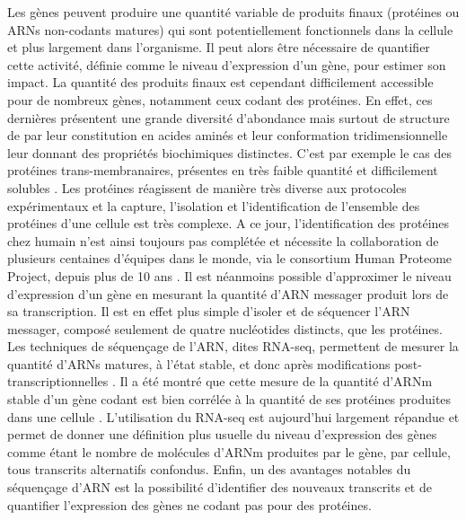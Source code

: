Les gènes peuvent produire une quantité variable de produits finaux (protéines ou \acrshort{ARN}s non-codants matures) qui sont potentiellement fonctionnels dans la cellule et plus largement dans l’organisme. Il peut alors être nécessaire de quantifier cette activité, définie comme le niveau d'expression d’un gène, pour estimer son impact. La quantité des produits finaux est cependant difficilement accessible pour de nombreux gènes, notamment ceux codant des protéines. En effet, ces dernières présentent une grande diversité d’abondance mais surtout de structure de par leur constitution en acides aminés et leur conformation tridimensionnelle leur donnant des propriétés biochimiques distinctes. C’est par exemple le cas des protéines trans-membranaires, présentes en très faible quantité et difficilement solubles \citep{vuckovic_membrane_2013}. Les protéines réagissent de manière très diverse aux protocoles expérimentaux et la capture, l’isolation et l’identification de l’ensemble des protéines d’une cellule est très complexe. A ce jour, l’identification des protéines chez humain n’est ainsi toujours pas complétée et nécessite la collaboration de plusieurs centaines d'équipes dans le monde, via le consortium Human Proteome Project, depuis plus de 10 ans \citep{adhikari_high-stringency_2020}. Il est néanmoins possible d’approximer le niveau d’expression d’un gène en mesurant la quantité d’\acrshort{ARN} messager produit lors de sa transcription. Il est en effet plus simple d’isoler et de séquencer l’\acrshort{ARN} messager, composé seulement de quatre nucléotides distincts, que les protéines. Les techniques de séquençage de l’\acrshort{ARN}, dites \acrshort{RNA-seq}, permettent de mesurer la quantité d’\acrshort{ARN}s matures, à l’état stable, et donc après modifications post-transcriptionnelles \citep{chu_rna_2012}. Il a été montré que cette mesure de la quantité d’\acrshort{ARNm} stable d’un gène codant est bien corrélée à la quantité de ses protéines produites dans une cellule \citep{edfors_gene-specific_2016}. L’utilisation du \acrshort{RNA-seq} est aujourd’hui largement répandue et permet de donner une définition plus usuelle du niveau d’expression des gènes comme étant le nombre de molécules d’\acrshort{ARNm} produites par le gène, par cellule, tous transcrits alternatifs confondus. Enfin, un des avantages notables du séquençage d’\acrshort{ARN} est la possibilité d'identifier des nouveaux transcrits et de quantifier l’expression des gènes ne codant pas pour des protéines. \\

